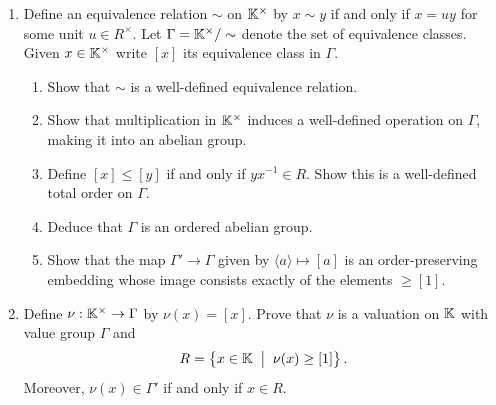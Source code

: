 \documentclass[12pt,reqno]{amsart}
\begin{document}
\begin{enumerate}[leftmargin=*]
\begin{enumerate}[label=(\alph*),ref=\theenumi\alph*]
	\item Define an equivalence relation $\sim$ on $\mathbb{K}^\times$ by $x \sim y$ if and only if $x=uy$ for some unit $u \in R^{\times}$. Let $\Gamma = \mathbb{K}^\times / \sim$ denote the set of equivalence classes. Given $x\in \mathbb{K}^{\times}$ write $[x]$ its equivalence class in $\Gamma$.
	\begin{enumerate}
		\item Show that $\sim$ is a well-defined equivalence relation.
		\item Show that multiplication in $\mathbb{K}^\times$ induces a well-defined operation on $\Gamma$, making it into an abelian group.
		\item Define $[x] \leq [y]$ if and only if $yx^{-1} \in R$. Show this is a well-defined total order on $\Gamma$.
		\item Deduce that $\Gamma$ is an ordered abelian group.
		\item Show that the map $\Gamma' \to \Gamma$ given by $\langle a \rangle \mapsto [a]$ is an order-preserving embedding whose image consists exactly of the elements $\ge [1]$.
	\end{enumerate}
	
	\item Define $\nu:\mathbb{K}^{\times} \to \Gamma$ by $\nu(x) = [x]$. Prove that $\nu$ is a valuation on $\mathbb{K}$ with value group $\Gamma$ and 
	\[
	R = \left\{ x \in \mathbb{K} \;\; \big| \;\; \nu(x) \geq [1] \right\}.
	\]
	Moreover, $\nu(x) \in \Gamma'$ if and only if $x \in R$. 
	\end{enumerate}
  
\end{enumerate}
\end{document}
